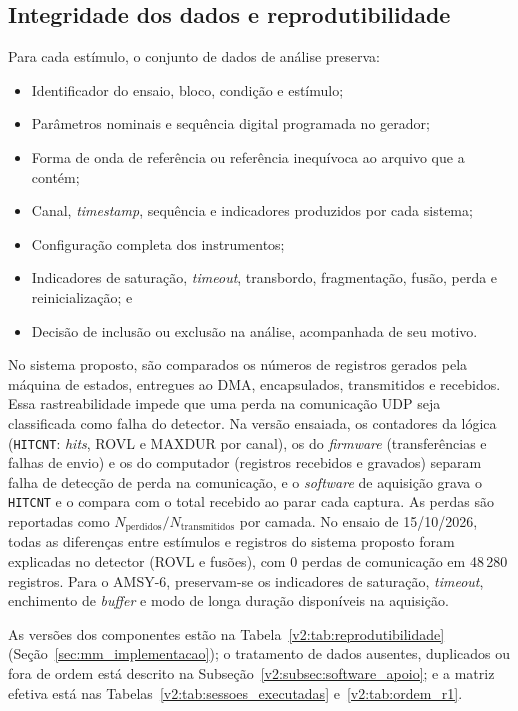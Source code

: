 \subsection{Integridade dos dados e reprodutibilidade}
\label{v2:subsec:integridade_dados_experimento}

Para cada estímulo, o conjunto de dados de análise preserva:
\begin{itemize}
	\item Identificador do ensaio, bloco, condição e estímulo;
	
	\item Parâmetros nominais e sequência digital programada no gerador;
	
	\item Forma de onda de referência ou referência inequívoca ao arquivo que a contém;
	
	\item Canal, \textit{timestamp}, sequência e indicadores produzidos por cada sistema;
	
	\item Configuração completa dos instrumentos;
	
	\item Indicadores de saturação, \textit{timeout}, transbordo, fragmentação, fusão, perda e reinicialização; e
	
	\item Decisão de inclusão ou exclusão na análise, acompanhada de seu motivo.
\end{itemize}

No sistema proposto, são comparados os números de registros gerados pela máquina de estados, entregues ao DMA, encapsulados, transmitidos e recebidos. Essa rastreabilidade impede que uma perda na comunicação UDP seja classificada como falha do detector. Na versão ensaiada, os contadores da lógica (\texttt{HITCNT}: \textit{hits}, ROVL e MAXDUR por canal), os do \textit{firmware} (transferências e falhas de envio) e os do computador (registros recebidos e gravados) separam falha de detecção de perda na comunicação, e o \textit{software} de aquisição grava o \texttt{HITCNT} e o compara com o total recebido ao parar cada captura. As perdas são reportadas como \(N_{\mathrm{perdidos}}/N_{\mathrm{transmitidos}}\) por camada. No ensaio de 15/10/2026, todas as diferenças entre estímulos e registros do sistema proposto foram explicadas no detector (ROVL e fusões), com 0 perdas de comunicação em 48\,280 registros. Para o AMSY-6, preservam-se os indicadores de saturação, \textit{timeout}, enchimento de \textit{buffer} e modo de longa duração disponíveis na aquisição.

As versões dos componentes estão na Tabela~\ref{v2:tab:reprodutibilidade} (Seção~\ref{sec:mm_implementacao}); o tratamento de dados ausentes, duplicados ou fora de ordem está descrito na Subseção~\ref{v2:subsec:software_apoio}; e a matriz efetiva está nas Tabelas~\ref{v2:tab:sessoes_executadas} e~\ref{v2:tab:ordem_r1}.

